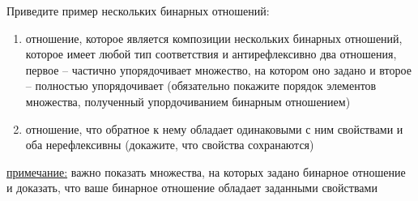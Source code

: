 \question
Приведите  пример  нескольких бинарных отношений:
\begin{enumerate}
	\renewcommand{\labelenumi}{\alph{enumi})}
	\item отношение, которое является композиции нескольких бинарных отношений,  которое имеет любой тип соответствия и антирефлексивно
	два отношения, первое -- частично упорядочивает множество, на котором оно задано и второе -- полностью упорядочивает (обязательно покажите порядок элементов множества, полученный упордочиванием бинарным отношением)
	\item отношение, что  обратное к нему  обладает одинаковыми с ним свойствами и оба нерефлексивны (докажите, что свойства сохранаются)
\end{enumerate}

\underline{примечание:} важно показать  множества, на которых задано бинарное отношение и доказать, что ваше бинарное отношение обладает заданными свойствами
